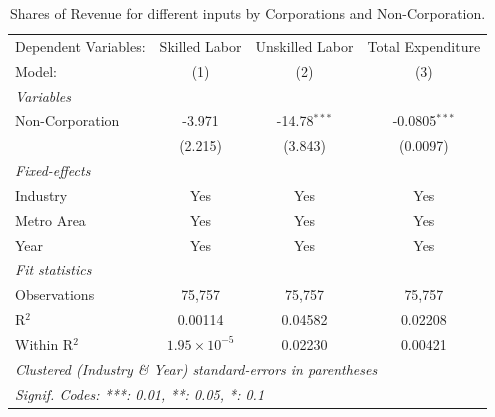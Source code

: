\documentclass[
  12pt]{article}
\theoremstyle{definition}
\theoremstyle{remark}
\begin{document}
\begin{table}

\caption{\label{tbl-reg-shares-2}Shares of Revenue for different inputs
by Corporations and Non-Corporation.}

\begin{minipage}{\linewidth}

\begingroup
\centering
\begin{tabular}{lccc}
   \tabularnewline \midrule \midrule
   Dependent Variables: & Skilled Labor         & Unskilled Labor & Total Expenditure\\  
   Model:               & (1)                   & (2)             & (3)\\  
   \midrule
   \emph{Variables}\\
   Non-Corporation      & -3.971                & -14.78$^{***}$  & -0.0805$^{***}$\\   
                        & (2.215)               & (3.843)         & (0.0097)\\   
   \midrule
   \emph{Fixed-effects}\\
   Industry             & Yes                   & Yes             & Yes\\  
   Metro Area           & Yes                   & Yes             & Yes\\  
   Year                 & Yes                   & Yes             & Yes\\  
   \midrule
   \emph{Fit statistics}\\
   Observations         & 75,757                & 75,757          & 75,757\\  
   R$^2$                & 0.00114               & 0.04582         & 0.02208\\  
   Within R$^2$         & $1.95\times 10^{-5}$  & 0.02230         & 0.00421\\  
   \midrule \midrule
   \multicolumn{4}{l}{\emph{Clustered (Industry \& Year) standard-errors in parentheses}}\\
   \multicolumn{4}{l}{\emph{Signif. Codes: ***: 0.01, **: 0.05, *: 0.1}}\\
\end{tabular}
\par\endgroup

\end{minipage}%

\end{table}%
\end{document}

